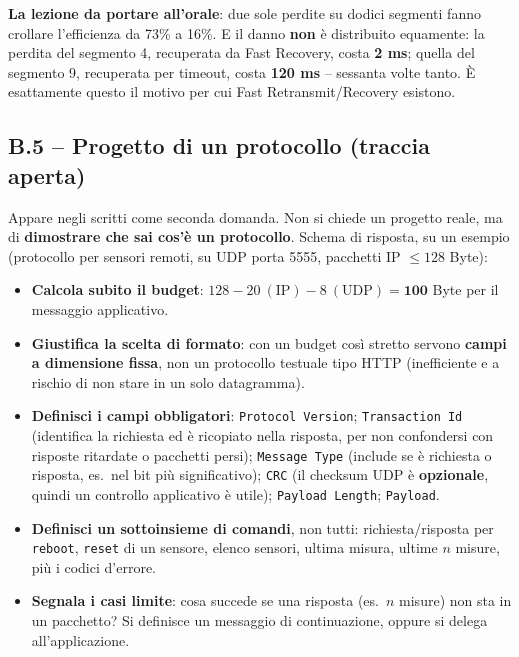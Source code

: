 \documentclass[12pt, a4paper]{article}
\begin{document}
\begin{tcolorbox}[colback=orange!5, colframe=orange!70!black, title=\textbf{Esercizio B.4 (esame 16 giugno 2015, soluzione ufficiale)}]
\textcolor{blue!70!black}{\textbf{La lezione da portare all'orale}}: due sole perdite su dodici segmenti fanno crollare l'efficienza da 73\% a 16\%. E il danno \textbf{non} è distribuito equamente: la perdita del segmento 4, recuperata da Fast Recovery, costa \textbf{2 ms}; quella del segmento 9, recuperata per timeout, costa \textbf{120 ms} -- sessanta volte tanto. È esattamente questo il motivo per cui Fast Retransmit/Recovery esistono.
\end{tcolorbox}

\subsection*{B.5 -- Progetto di un protocollo (traccia aperta)}

Appare negli scritti come seconda domanda. Non si chiede un progetto reale, ma di \textbf{dimostrare che sai cos'è un protocollo}. Schema di risposta, su un esempio (protocollo per sensori remoti, su UDP porta 5555, pacchetti IP $\leq 128$ Byte):

\begin{itemize}
    \item \textbf{Calcola subito il budget}: $128 - 20\ (\text{IP}) - 8\ (\text{UDP}) = \mathbf{100}$ Byte per il messaggio applicativo.
    \item \textbf{Giustifica la scelta di formato}: con un budget così stretto servono \textbf{campi a dimensione fissa}, non un protocollo testuale tipo HTTP (inefficiente e a rischio di non stare in un solo datagramma).
    \item \textbf{Definisci i campi obbligatori}: \texttt{Protocol Version}; \texttt{Transaction Id} (identifica la richiesta ed è ricopiato nella risposta, per non confondersi con risposte ritardate o pacchetti persi); \texttt{Message Type} (include se è richiesta o risposta, es.\ nel bit più significativo); \texttt{CRC} (il checksum UDP è \textbf{opzionale}, quindi un controllo applicativo è utile); \texttt{Payload Length}; \texttt{Payload}.
    \item \textbf{Definisci un sottoinsieme di comandi}, non tutti: richiesta/risposta per \texttt{reboot}, \texttt{reset} di un sensore, elenco sensori, ultima misura, ultime $n$ misure, più i codici d'errore.
    \item \textbf{Segnala i casi limite}: cosa succede se una risposta (es.\ $n$ misure) non sta in un pacchetto? Si definisce un messaggio di continuazione, oppure si delega all'applicazione.
\end{itemize}
\end{document}
